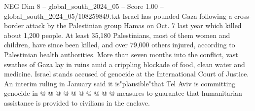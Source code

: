 \begin{textsample}{NEG Dim 8 – global\_south\_2024\_05 – Score 1.00 – global\_south\_2024\_05/108259849.txt}
Israel has pounded Gaza following a cross-border attack by the Palestinian group Hamas on Oct. 7 last year which killed about 1,200 people.
At least 35,180 Palestinians, most of them women and children, have since been killed, and over 79,000 others injured, according to Palestinian health authorities.
More than seven months into the conflict, vast swathes of Gaza lay in ruins amid a crippling blockade of food, clean water and medicine.
Israel stands accused of genocide at the International Court of Justice.
An interim ruling in January said it is"plausible"that Tel Aviv is committing genocide in @ @ @ @ @ @ @ @ @ @ measures to guarantee that humanitarian assistance is provided to civilians in the enclave.

\end{textsample}
